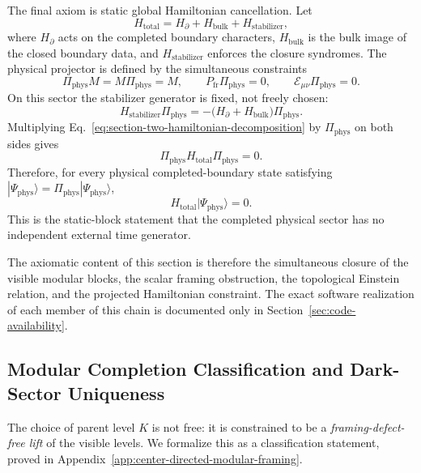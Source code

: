 \documentclass[11pt,letterpaper]{article}
\theoremstyle{plain}
\newcommand{\Kpar}{K}
\newcommand{\Ebulk}{\mathcal E_{\mu\nu}}
\newcommand{\Htotal}{H_{\text{total}}}
\newcommand{\Hboundary}{H_{\partial}}
\newcommand{\Hbulk}{H_{\text{bulk}}}
\newcommand{\Hstab}{H_{\text{stabilizer}}}
\begin{document}
The final axiom is static global Hamiltonian cancellation.  Let
\begin{equation}
\label{eq:section-two-hamiltonian-decomposition}
 \Htotal
 =
 \Hboundary+\Hbulk+\Hstab,
\end{equation}
where $\Hboundary$ acts on the completed boundary characters, $\Hbulk$ is the
bulk image of the closed boundary data, and $\Hstab$ enforces the closure
syndromes.
The physical projector is defined by the simultaneous constraints
\begin{equation}
\label{eq:section-two-physical-projector}
 \Pi_{\text{phys}}M=M\Pi_{\text{phys}}=M,
 \qquad
 P_{\text{fr}}\Pi_{\text{phys}}=0,
 \qquad
 \Ebulk\Pi_{\text{phys}}=0.
\end{equation}
On this sector the stabilizer generator is fixed, not freely chosen:
\begin{equation}
\label{eq:section-two-stabilizer-cancellation}
 \Hstab\Pi_{\text{phys}}
 =
 -\bigl(\Hboundary+\Hbulk\bigr)\Pi_{\text{phys}}.
\end{equation}
Multiplying Eq.~\eqref{eq:section-two-hamiltonian-decomposition} by
$\Pi_{\text{phys}}$ on both sides gives
\begin{equation}
\label{eq:section-two-pi-h-pi-zero}
 \Pi_{\text{phys}}\Htotal\Pi_{\text{phys}}=0.
\end{equation}
Therefore, for every physical completed-boundary state satisfying
$|\Psi_{\text{phys}}\rangle=\Pi_{\text{phys}}|\Psi_{\text{phys}}\rangle$,
\begin{equation}
\label{eq:section-two-global-hamiltonian-cancellation}
 \boxed{
 \Htotal|\Psi_{\text{phys}}\rangle=0.}
\end{equation}
This is the static-block statement that the completed physical sector has no
independent external time generator.

The axiomatic content of this section is therefore the simultaneous closure of
the visible modular blocks, the scalar framing obstruction, the topological
Einstein relation, and the projected Hamiltonian constraint.  The exact
software realization of each member of this chain is documented only in
Section~\ref{sec:code-availability}.

\subsection{Modular Completion Classification and Dark-Sector Uniqueness}
\label{sec:modular-completion-classification}

The choice of parent level $\Kpar$ is not free: it is constrained to be a
\emph{framing-defect-free lift} of the visible levels.  We formalize this as a
classification statement, proved in
Appendix~\ref{app:center-directed-modular-framing}.
\end{document}

